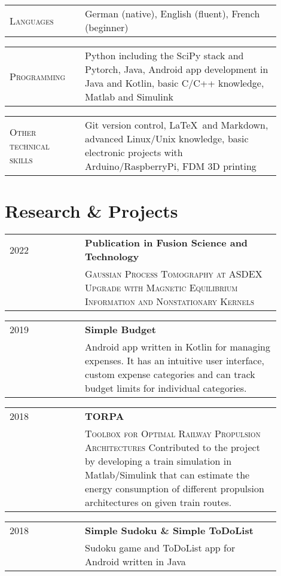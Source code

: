 \documentclass[a4paper, 10pt]{article}
\newenvironment{cventry}[2]
{   
    \setlength{\tabcolsep}{1.25em}
    \hypersetup{urlcolor=black}
    \begin{center}\hspace{-1.25cm}\begin{tabular}{p{0.25\linewidth}|p{0.65\linewidth}}
    \raggedleft\scshape #1 & \bfseries#2 \vspace{0.1cm}\\ & 
}
{\end{tabular}\end{center}}
\newenvironment{cventrynoheading}[1]
{
    \setlength{\tabcolsep}{1.25em}
    \begin{center}\hspace{-1.25cm}\begin{tabular}{p{0.25\linewidth}|p{0.65\linewidth}}
    \raggedleft\scshape #1 & 
}
{\end{tabular}\end{center}}
\begin{document}
\begin{cventrynoheading}{Languages}
    German (native), English (fluent), French (beginner)
\end{cventrynoheading}

\begin{cventrynoheading}{Programming}
    Python including the SciPy stack and Pytorch, Java, Android app development 
    in Java and Kotlin, basic C/C++ knowledge, Matlab and Simulink
\end{cventrynoheading}

\begin{cventrynoheading}{Other technical skills}
    Git version control, \LaTeX\ and Markdown, advanced Linux/Unix knowledge, 
    basic electronic projects with Arduino/RaspberryPi, FDM 3D printing
\end{cventrynoheading}


\section{Research \& Projects}

\begin{cventry}{2022}{Publication in Fusion Science and Technology 
    \href{https://doi.org/10.1080/15361055.2022.2072659}{\footnotesize\faIcon{link}}}
    {\scshape Gaussian Process Tomography at ASDEX Upgrade with 
    Magnetic Equilibrium Information and Nonstationary Kernels}
\end{cventry}

\begin{cventry}{2019}
    {Simple Budget \href{https://github.com/korbi98/Simple-Budget}{\normalfont\faGithub}}
    Android app written in Kotlin for managing expenses. It has an intuitive 
    user interface, custom expense categories and can track budget limits 
    for individual categories.
\end{cventry}

\begin{cventry}{2018}
    {TORPA 
    \href{https://www.researchgate.net/project/TORPA-Toolbox-for-Optimal-Railway-Propulsion-Architectures}
    {\footnotesize\faIcon{link}}}
    {\scshape Toolbox for Optimal Railway Propulsion Architectures}
    Contributed to the project by developing a train simulation 
    in Matlab/Simulink that can estimate the energy consumption of 
    different propulsion architectures on given train routes.
\end{cventry}

\begin{cventry}{2018}
    {Simple Sudoku \href{https://github.com/korbi98/Simple-Sudoku}{\normalfont\faGithub} 
    \& Simple ToDoList \href{https://github.com/korbi98/Simple-ToDoList}{\normalfont\faGithub}}
    Sudoku game and ToDoList app for Android written in Java
\end{cventry}
\end{document}
